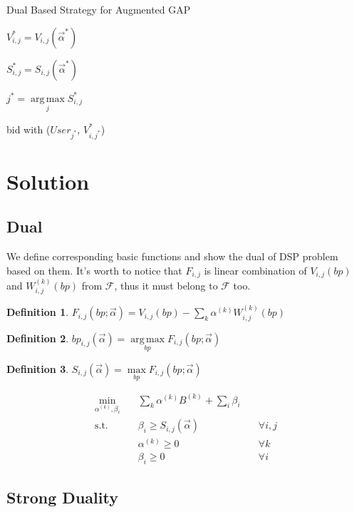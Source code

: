 \documentclass{article}
\theoremstyle{definition}
\newtheorem{definition}{Definition}[section]
\DeclareMathOperator*{\argmax}{arg\,max}
\newcommand{\sumi}{\sum\limits_i}
\newcommand{\sumk}{\sum\limits_k}
\newcommand{\sbp}{bp_{i,j}}
\newcommand{\sV}{V_{i,j}}
\newcommand{\sW}{W_{i,j}^{(k)}}
\newcommand{\sB}{B^{(k)}}
\newcommand{\salpha}{\alpha^{(k)}}
\newcommand{\sbeta}{\beta_i}
\newcommand{\sF}{F_{i,j}}
\newcommand{\sS}{S_{i,j}}
\newcommand{\valpha}{\vec{\alpha}}
\newcommand{\uff}{\mathscr{F}}
\newcommand{\scoreconstraint}{\sbeta \ge \sS(\vec{\alpha})}
\begin{document}
\begin{CJK}{UTF8}{gbsn}
\begin{algorithm}
\caption{Dual Based Strategy for Augmented GAP}

{
  {
    $\sV^* = \sV(\valpha^*)$

    $\sS^* = \sS(\valpha^*)$
  }
  $j^* = \argmax\limits_j \sS^*$
  
   { bid with ($User_{j^*}$, $V_{i,j^*}^*$) }
}
\end{algorithm}

\newpage
\section{Solution}

\subsection{Dual}

We define corresponding basic functions and show the dual of DSP problem based on them.
It's worth to notice that $\sF$ is linear combination of $\sV(bp)$ and $\sW(bp)$ from $\uff$, thus it must belong to $\uff$ too.

\begin{definition}
$\sF(bp; \valpha) = \sV(bp) - \sumk \salpha \sW(bp)$
\end{definition}

\begin{definition}
$\sbp(\valpha) = \argmax\limits_{bp} \sF(bp; \valpha)$
\end{definition}

\begin{definition}
$\sS(\valpha) = \max\limits_{bp} \sF(bp; \valpha)$
\end{definition}

\begin{alignat}{2}
    \min\limits_{\salpha, \sbeta} \quad & \sumk \salpha \sB + \sumi \sbeta \quad & {} \\
    \mbox{s.t.} \quad                   & \scoreconstraint \quad                 & \forall i,j \\
    \quad                               & \salpha \ge 0 \quad                    & \forall k \\
    \quad                               & \sbeta \ge 0 \quad                     & \forall i
\end{alignat}

\subsection{Strong Duality}


\end{CJK}
\end{document}

